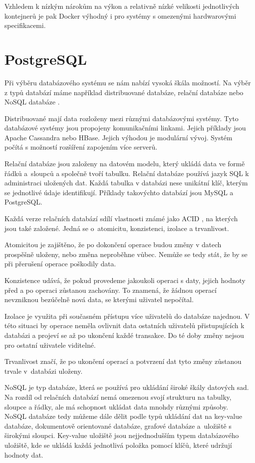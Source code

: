 Vzhledem k nízkým nárokům na výkon a relativně nízké velikosti jednotlivých kontejnerů je pak Docker výhodný i pro systémy s omezenými hardwarovými specifikacemi. 

\section{PostgreSQL}

Při výběru databázového systému se nám nabízí vysoká škála možností. 
Na výběr z typů databází máme například distribuované databáze, relační databáze nebo NoSQL databáze \cite{db-type}.

Distribuované mají data rozloženy mezi různými databázovými systémy. 
Tyto databázové systémy jsou propojeny komunikačními linkami. Jejich příklady jsou Apache Cassandra nebo HBase. 
Jejich výhodou je modulární vývoj. Systém počítá s možností rozšíření zapojením více serverů.

Relační databáze jsou založeny na datovém modelu, který ukládá data ve formě řádků a~sloupců a společně tvoří tabulku. 
Relační databáze používá jazyk SQL k administraci uložených dat. 
Každá tabulka v databázi nese unikátní klíč, kterým se jednotlivé údaje identifikují. 
Příklady takovýchto databází jsou MySQL a PostgreSQL.

Každá verze relačních databází sdílí vlastnosti známé jako ACID \cite{acid}, na kterých jsou také založené. 
Jedná se o~atomicitu, konzistenci, izolace a trvanlivost. 

Atomicitou je zajištěno, že po dokončení operace budou změny v datech prospěšně uloženy, nebo změna neproběhne vůbec. 
Nemůže se tedy stát, že by se při přerušení operace poškodily data. 

Konzistence udává, že pokud provedeme jakoukoli operaci s daty, jejich hodnoty před a po operaci zůstanou zachovány. 
To znamená, že žádnou operací nevzniknou bezúčelně nová data, se kterými uživatel nepočítal. 

Izolace je využita při současném přístupu více uživatelů do databáze najednou. 
V této situaci by operace neměla ovlivnit data ostatních uživatelů přistupujících k databázi a projeví se až po ukončení každé transakce. 
Do té doby změny nejsou pro ostatní uživatele viditelné.

Trvanlivost značí, že po ukončení operací a potvrzení dat tyto změny zůstanou trvale v~databázi uloženy.

NoSQL je typ databáze, která se používá pro ukládání široké škály datových sad. 
Na rozdíl od relačních databází nemá omezenou svojí strukturu na tabulky, sloupce a řádky, ale má schopnost ukládat data mnohdy různými způsoby. 
NoSQL databáze tedy můžeme dále dělit podle typů ukládání dat na key-value databáze, dokumentově orientované databáze, grafové databáze a~uložiště s širokými sloupci. 
Key-value uložiště jsou nejjednodušším typem databázového uložiště, kde se ukládá každá jednotlivá položka pomocí klíčů, které udržují hodnoty dat.

